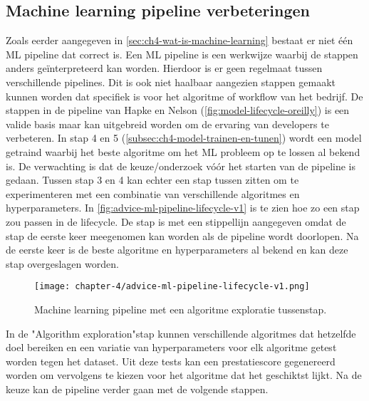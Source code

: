 \subsection{Machine learning pipeline verbeteringen}\label{subsec:ch4-machine-learning-pipeline-verbeteringen}
Zoals eerder aangegeven in \autoref{sec:ch4-wat-is-machine-learning} bestaat er niet één ML pipeline dat correct is. Een ML pipeline is een werkwijze waarbij de stappen anders geïnterpreteerd kan worden. Hierdoor is er geen regelmaat tussen verschillende pipelines. Dit is ook niet haalbaar aangezien stappen gemaakt kunnen worden dat specifiek is voor het algoritme of workflow van het bedrijf. De stappen in de pipeline van Hapke en Nelson (\autoref{fig:model-lifecycle-oreilly}) is een valide basis maar kan uitgebreid worden om de ervaring van developers te verbeteren. In stap 4 en 5 (\autoref{subsec:ch4-model-trainen-en-tunen}) wordt een model getraind waarbij het beste algoritme om het ML probleem op te lossen al bekend is. De verwachting is dat de keuze/onderzoek vóór het starten van de pipeline is gedaan. Tussen stap 3 en 4 kan echter een stap tussen zitten om te experimenteren met een combinatie van verschillende algoritmes en hyperparameters. In \autoref{fig:advice-ml-pipeline-lifecycle-v1} is te zien hoe zo een stap zou passen in de lifecycle. De stap is met een stippellijn aangegeven omdat de stap de eerste keer meegenomen kan worden als de pipeline wordt doorlopen. Na de eerste keer is de beste algoritme en hyperparameters al bekend en kan deze stap overgeslagen worden.

\begin{figure}[hbt!]
  \centering
  \texttt{[image: chapter-4/advice-ml-pipeline-lifecycle-v1.png]}
  \caption{Machine learning pipeline met een algoritme exploratie tussenstap.}
  \label{fig:advice-ml-pipeline-lifecycle-v1}
\end{figure}

In de "Algorithm exploration"\space stap kunnen verschillende algoritmes dat hetzelfde doel bereiken en een variatie van hyperparameters voor elk algoritme getest worden tegen het dataset. Uit deze tests kan een prestatiescore gegenereerd worden om vervolgens te kiezen voor het algoritme dat het geschiktst lijkt. Na de keuze kan de pipeline verder gaan met de volgende stappen.

